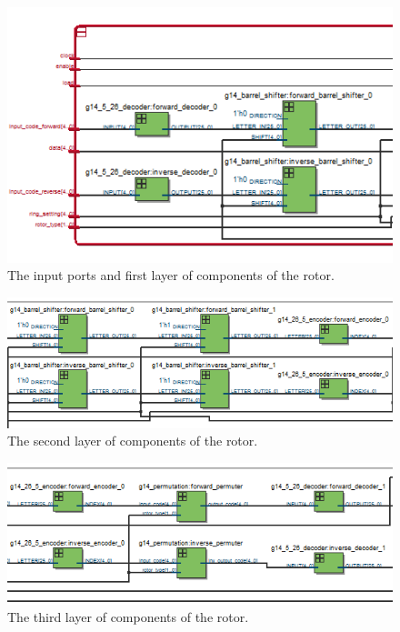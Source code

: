 \documentclass{article}
\begin{document}
\begin{figure}[ht!]
    \centering
    \includegraphics[scale=0.9]{rotor_1.PNG}
    \caption{The input ports and first layer of components of the rotor.}
    \label{fig:rotor_1}
\end{figure}

\begin{figure}[ht!]
    \centering
    \includegraphics[scale=0.7]{rotor_2.PNG}
    \caption{The second layer of components of the rotor.}
    \label{fig:rotor_2}
\end{figure}

\begin{figure}[ht!]
    \centering
    \includegraphics[scale=0.7]{rotor_3.PNG}
    \caption{The third layer of components of the rotor.}
    \label{fig:rotor_3}
\end{figure}
\end{document}
